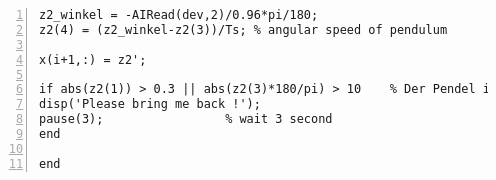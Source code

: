 \begin{lstlisting}[numbers=left,basicstyle=\scriptsize,caption={Source code of sliding mode controller (Real implementation).},captionpos=b]
% angular speed calculation (derivative) 
z2_winkel = -AIRead(dev,2)/0.96*pi/180;
z2(4) = (z2_winkel-z2(3))/Ts; % angular speed of pendulum

x(i+1,:) = z2';

if abs(z2(1)) > 0.3 || abs(z2(3)*180/pi) > 10    % Der Pendel ist ausser Bereich
disp('Please bring me back !');
pause(3);                 % wait 3 second
end

end
\end{lstlisting}